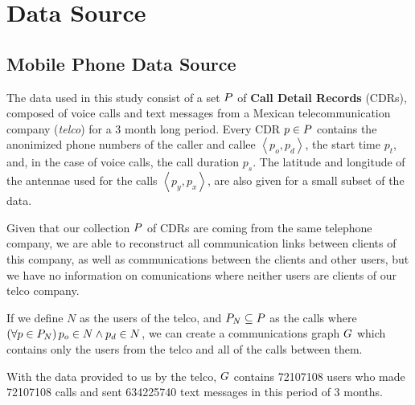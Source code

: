 \section{Data Source}

\subsection{Mobile Phone Data Source}

The data used in this study consist of a set \( \mathlarger{P} \) of \textbf{Call Detail Records} (CDRs), composed of voice calls and text messages from a Mexican telecommunication company (\textit{telco}) for a 3 month long period.
Every CDR \( p \in \mathlarger{P} \)  contains the anonimized phone numbers of the caller and callee \( \left< p_o, p_d \right> \), the start time \( p_t \), and, in the case of voice calls, the call duration \( p_s \). 
The latitude and longitude of the antennae used for the calls \( \left< p_y, p_x \right> \), are also given for a small subset of the data.

Given that our collection \( \mathlarger{P} \) of CDRs are coming from the same telephone company, we are able to reconstruct all communication links between clients of this company, as well as communications between the clients and other users, but we have no information on comunications where neither users are clients of our telco company.

If we define \( N \) as the users of the telco, and \( \mathlarger{P}_N \subseteq \mathlarger{P} \) as the calls where \( \left( \forall p \in \mathlarger{P}_N \right) p_o \in N \wedge p_d \in N \), we can create a communications graph \( \mathlarger{G} \) which contains only the users from the telco and all of the calls between them.

With the data provided to us by the telco, \( \mathlarger{G} \) contains \num{72107108} users who made \num{72107108} calls and sent \num{634225740} text messages in this period of 3 months.

